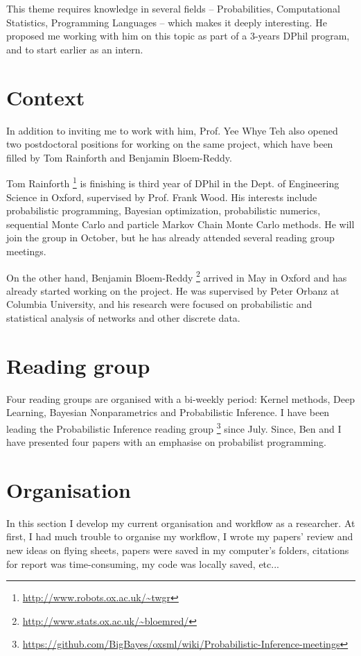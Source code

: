 \documentclass[twoside,10pt,openany,a4paper]{rapport}
\begin{document}
This theme requires knowledge in several fields -- Probabilities, Computational Statistics, Programming Languages -- which makes it deeply interesting.
He proposed me working with him on this topic as part of a 3-years DPhil program, and to start earlier as an intern.

\section{Context}
In addition to inviting me to work with him, Prof. Yee Whye Teh also opened two postdoctoral positions for working on the same project, which have been filled by Tom Rainforth and Benjamin Bloem-Reddy. 

Tom Rainforth \footnote{\url{http://www.robots.ox.ac.uk/~twgr}} is finishing is third year of DPhil in the Dept. of Engineering Science in Oxford, supervised by Prof. Frank Wood. His interests include  probabilistic programming, Bayesian optimization, probabilistic numerics, sequential Monte Carlo and particle Markov Chain Monte Carlo methods. He will join the group in October, but he has already attended several reading group meetings.

On the other hand, Benjamin Bloem-Reddy \footnote{\url{http://www.stats.ox.ac.uk/~bloemred/}} arrived in May in Oxford and has already started working on the project. He was supervised by Peter Orbanz at Columbia University, and his research were focused on probabilistic and statistical analysis of networks and other discrete data.

\section{Reading group}

Four reading groups are organised with a bi-weekly period: Kernel methods, Deep Learning, Bayesian Nonparametrics and Probabilistic Inference.
I have been leading the Probabilistic Inference reading group \footnote{\url{https://github.com/BigBayes/oxsml/wiki/Probabilistic-Inference-meetings}} since July. Since, Ben and I have presented four papers \cite{Ritchie:2016ve, Edward, Ritchie:2015tx, DelMoral:2015jk} with an emphasise on probabilist programming.

\section{Organisation}
In this section I develop my current organisation and workflow as a researcher.
At first, I had much trouble to organise my workflow, I wrote my papers' review and new ideas on flying sheets, papers were saved in my computer's folders, citations for report was time-consuming, my code was locally saved, etc... 
\end{document}
